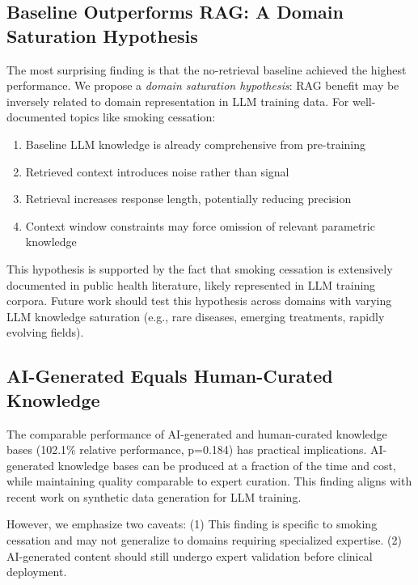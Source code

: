 \documentclass[10pt,letterpaper]{article}
\begin{document}
\subsection*{Baseline Outperforms RAG: A Domain Saturation Hypothesis}
The most surprising finding is that the no-retrieval baseline achieved the highest performance. We propose a \textit{domain saturation hypothesis}: RAG benefit may be inversely related to domain representation in LLM training data. For well-documented topics like smoking cessation:
\begin{enumerate}
    \item Baseline LLM knowledge is already comprehensive from pre-training
    \item Retrieved context introduces noise rather than signal
    \item Retrieval increases response length, potentially reducing precision
    \item Context window constraints may force omission of relevant parametric knowledge
\end{enumerate}

This hypothesis is supported by the fact that smoking cessation is extensively documented in public health literature, likely represented in LLM training corpora. Future work should test this hypothesis across domains with varying LLM knowledge saturation (e.g., rare diseases, emerging treatments, rapidly evolving fields).

\subsection*{AI-Generated Equals Human-Curated Knowledge}
The comparable performance of AI-generated and human-curated knowledge bases (102.1\% relative performance, p=0.184) has practical implications. AI-generated knowledge bases can be produced at a fraction of the time and cost, while maintaining quality comparable to expert curation. This finding aligns with recent work on synthetic data generation for LLM training\cite{xu2023wizardlm}.

However, we emphasize two caveats: (1) This finding is specific to smoking cessation and may not generalize to domains requiring specialized expertise. (2) AI-generated content should still undergo expert validation before clinical deployment.
\end{document}
